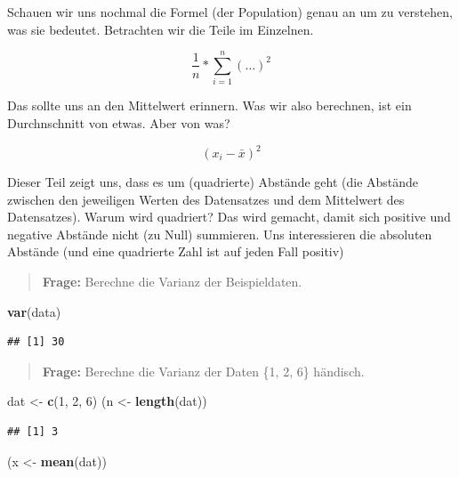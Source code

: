\documentclass[
]{book}
\newenvironment{Shaded}{\begin{snugshade}}{\end{snugshade}}
\newcommand{\DecValTok}[1]{\textcolor[rgb]{0.00,0.00,0.81}{#1}}
\newcommand{\KeywordTok}[1]{\textcolor[rgb]{0.13,0.29,0.53}{\textbf{#1}}}
\newcommand{\NormalTok}[1]{#1}
\newcommand{\StringTok}[1]{\textcolor[rgb]{0.31,0.60,0.02}{#1}}
\begin{document}
Schauen wir uns nochmal die Formel (der Population) genau an um zu verstehen, was sie bedeutet. Betrachten wir die Teile im Einzelnen.

\[ \frac{1}{n}*\sum_{i=1}^{n}\left( \dots  \right)^2\]

Das sollte uns an den Mittelwert erinnern. Was wir also berechnen, ist ein Durchnschnitt von etwas. Aber von was?

\[ \left( x_i - \bar{x}  \right)^2\]

Dieser Teil zeigt uns, dass es um (quadrierte) Abstände geht (die Abstände zwischen den jeweiligen Werten des Datensatzes und dem Mittelwert des Datensatzes). Warum wird quadriert? Das wird gemacht, damit sich positive und negative Abstände nicht (zu Null) summieren. Uns interessieren die absoluten Abstände (und eine quadrierte Zahl ist auf jeden Fall positiv)

\begin{quote}
\textbf{Frage:} Berechne die Varianz der Beispieldaten.
\end{quote}

\begin{Shaded}
\begin{Highlighting}[]
\KeywordTok{var}\NormalTok{(data)}
\end{Highlighting}
\end{Shaded}

\begin{verbatim}
## [1] 30
\end{verbatim}

\begin{quote}
\textbf{Frage:} Berechne die Varianz der Daten \{1, 2, 6\} händisch.
\end{quote}

\begin{Shaded}
\begin{Highlighting}[]
\NormalTok{dat <-}\StringTok{ }\KeywordTok{c}\NormalTok{(}\DecValTok{1}\NormalTok{, }\DecValTok{2}\NormalTok{, }\DecValTok{6}\NormalTok{)}
\NormalTok{(n <-}\StringTok{ }\KeywordTok{length}\NormalTok{(dat))}
\end{Highlighting}
\end{Shaded}

\begin{verbatim}
## [1] 3
\end{verbatim}

\begin{Shaded}
\begin{Highlighting}[]
\NormalTok{(x <-}\StringTok{ }\KeywordTok{mean}\NormalTok{(dat))}
\end{Highlighting}
\end{Shaded}
\end{document}
